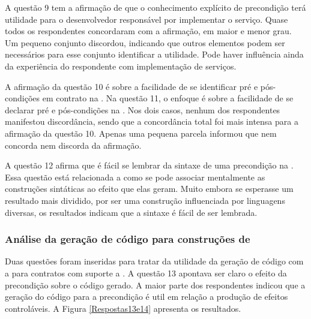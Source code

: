 A questão 9 tem a afirmação de que o conhecimento explícito de precondição terá
utilidade para o desenvolvedor responsável por implementar o serviço. Quase
todos os respondentes concordaram com a afirmação, em maior e menor grau. Um
pequeno conjunto discordou, indicando que outros elementos podem ser
necessários para esse conjunto identificar a utilidade. Pode haver influência
ainda da experiência do respondente com implementação de serviços.

A afirmação da questão 10 é sobre a facilidade de se identificar pré e
pós-condições em contrato na \neoidl{}. Na questão 11, o enfoque é sobre a
facilidade de se declarar pré e pós-condições na \neoidl{}. Nos dois casos,
nenhum dos respondentes manifestou discordância, sendo que a concordância total foi mais
intensa para a afirmação da questão 10. Apenas uma pequena parcela informou que
nem concorda nem discorda da afirmação.

A questão 12 afirma que é fácil se lembrar da sintaxe de uma precondição na
\neoidl{}. Essa questão está relacionada a como se pode associar mentalmente as
construções sintáticas ao efeito que elas geram. Muito embora se esperasse um
resultado mais dividido, por ser uma construção influenciada por linguagens
diversas, os resultados indicam que a sintaxe é fácil de ser lembrada.

\subsubsection{Análise da geração de código para construções de \designbycontract{}}

Duas questões foram inseridas para tratar da utilidade da geração de código com
a \neoidl{} para contratos com suporte a \designbycontract{}. A questão 13
apontava ser claro o efeito da precondição sobre o código gerado. A maior parte
dos respondentes indicou que a geração do código para a precondição é util
em relação a produção de efeitos controláveis. A Figura \ref{Respostas13e14}
apresenta os resultados.

